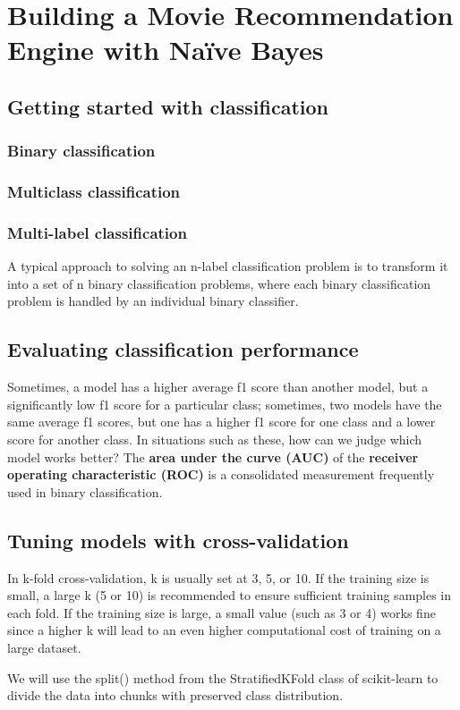 \chapter{Building a Movie Recommendation Engine with Naïve Bayes\label{Ch02}}
\section{Getting started with classification}
\subsection{Binary classification}
\subsection{Multiclass classification}
\subsection{Multi-label classification}
A typical approach to solving an n-label classification problem is to transform it into a set of n binary classification problems, where each binary classification problem is handled by an individual binary classifier.
\section{Evaluating classification performance}
Sometimes, a model has a higher average f1 score than another model, but a significantly low f1 score for a particular class; sometimes, two models have the same average f1 scores, but one has a higher f1 score for one class and a lower score for another class. In situations such as these, how can we judge which model works better? The \textbf{area under the curve (AUC)} of the \textbf{receiver operating characteristic (ROC)} is a consolidated measurement frequently used in binary classification.
\section{Tuning models with cross-validation}
\begin{tcolorbox}
    In k-fold cross-validation, k is usually set at 3, 5, or 10. If the training size is small, a large k (5 or 10) is recommended to ensure sufficient training samples in each fold. If the training size is large, a small value (such as 3 or 4) works fine since a higher k will lead to an even higher computational cost of training on a large dataset.
\end{tcolorbox}

We will use the split() method from the StratifiedKFold class of scikit-learn to divide the data into chunks with preserved class distribution.

